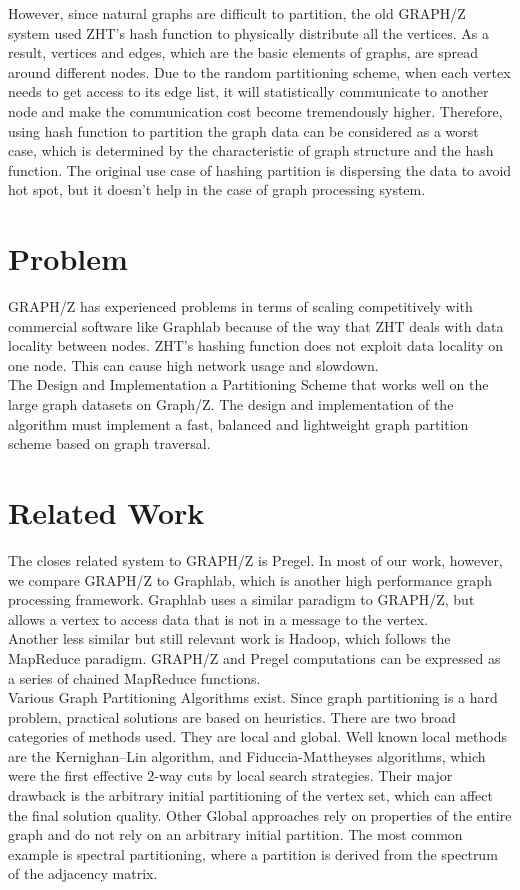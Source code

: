 \documentclass[10pt]{article}
\begin{document}
\begin{multicols}{2}
  However, since natural graphs are difficult to partition, the old GRAPH/Z system used ZHT’s hash function to physically distribute all the vertices. As a result, vertices and edges, which are the basic elements of graphs, are spread around different nodes. Due to the random partitioning scheme, when each vertex needs to get access to its edge list, it will statistically communicate to another node and make the communication cost become tremendously higher. Therefore, using hash function to partition the graph data can be considered as a worst case, which is determined by the characteristic of graph structure and the hash function. The original use case of hashing partition is dispersing the data to avoid hot spot, but it doesn’t help in the case of graph processing system.
  
  \section{Problem}
  GRAPH/Z has experienced problems in terms of scaling competitively with commercial software like Graphlab because of the way that ZHT deals with data locality between nodes. ZHT's hashing function does not exploit data locality on one node. \cite{Gz:3} This can cause high network usage and slowdown.\\
  The Design and Implementation a Partitioning Scheme that works well on the large graph datasets on Graph/Z. The design and implementation of the algorithm must implement a fast, balanced and lightweight graph partition scheme based on graph traversal.
  \section{Related Work}
  The closes related system to GRAPH/Z is Pregel. In most of our work, however, we compare GRAPH/Z to Graphlab, which is another high performance graph processing framework. Graphlab uses a similar paradigm to GRAPH/Z, but allows a vertex to access data that is not in a message to the vertex. \cite{Gz:4} \\
  Another less similar but still relevant work is Hadoop, which follows the MapReduce paradigm. GRAPH/Z and Pregel computations can be expressed as a series of chained MapReduce functions. \cite{Gz:4}\\
  Various Graph Partitioning Algorithms exist. Since graph partitioning is a hard problem, practical solutions are based on heuristics. There are two broad categories of methods used. They are local and global. Well known local methods are the Kernighan–Lin algorithm, and Fiduccia-Mattheyses algorithms, which were the first effective 2-way cuts by local search strategies. Their major drawback is the arbitrary initial partitioning of the vertex set, which can affect the final solution quality. Other Global approaches rely on properties of the entire graph and do not rely on an arbitrary initial partition. The most common example is spectral partitioning, where a partition is derived from the spectrum of the adjacency matrix.


\end{multicols}
\end{document}
